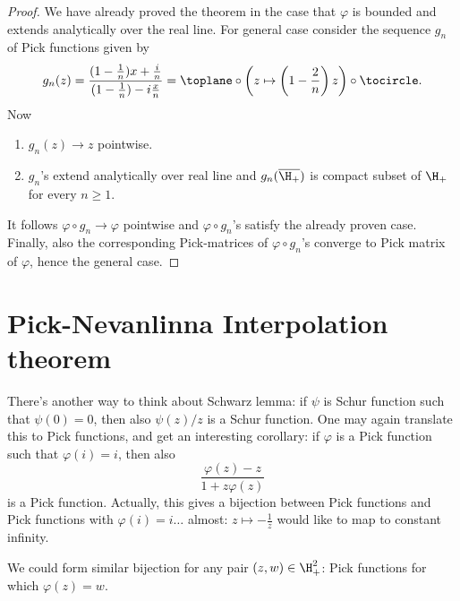 \begin{proof}
	We have already proved the theorem in the case that $\varphi$ is bounded and extends analytically over the real line. For general case consider the sequence $g_{n}$ of Pick functions given by
	\[
		g_{n}(z) = \frac{(1 - \frac{1}{n})x + \frac{i}{n}}{(1 - \frac{1}{n}) - i\frac{x}{n}} = \toplane \circ \left(z \mapsto \left(1 - \frac{2}{n}\right)z\right) \circ \tocircle.
	\]
	Now
	\begin{enumerate}
		\item $g_{n}(z) \to z$ pointwise.
		\item $g_{n}$'s extend analytically over real line and $g_{n}(\overline{\H_{+}})$ is compact subset of $\H_{+}$ for every $n \geq 1$.
	\end{enumerate}
	It follows $\varphi \circ g_{n} \to \varphi$ pointwise and $\varphi \circ g_{n}$'s satisfy the already proven case. Finally, also the corresponding Pick-matrices of $\varphi \circ g_{n}$'s converge to Pick matrix of $\varphi$, hence the general case.
\end{proof}

\section{Pick-Nevanlinna Interpolation theorem}

There's another way to think about Schwarz lemma: if $\psi$ is Schur function such that $\psi(0) = 0$, then also $\psi(z)/z$ is a Schur function. One may again translate this to Pick functions, and get an interesting corollary: if $\varphi$ is a Pick function such that $\varphi(i) = i$, then also
\[
	\frac{\varphi(z) - z}{1 + z \varphi(z)}
\]
is a Pick function. Actually, this gives a bijection between Pick functions and Pick functions with $\varphi(i) = i \ldots$ almost: $z \mapsto -\frac{1}{z}$ would like to map to constant infinity.

We could form similar bijection for any pair $(z, w) \in \H_{+}^{2}$: Pick functions for which $\varphi(z) = w$.

